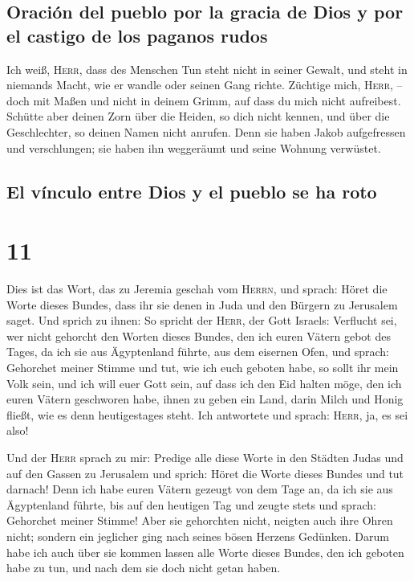 \hypertarget{oraciuxf3n-del-pueblo-por-la-gracia-de-dios-y-por-el-castigo-de-los-paganos-rudos}{%
\subsection{Oración del pueblo por la gracia de Dios y por el castigo de
los paganos
rudos}\label{oraciuxf3n-del-pueblo-por-la-gracia-de-dios-y-por-el-castigo-de-los-paganos-rudos}}

 Ich weiß, \textsc{Herr}, dass des Menschen Tun steht
nicht in seiner Gewalt, und steht in niemands Macht, wie er wandle oder
seinen Gang richte.  Züchtige mich, \textsc{Herr}, --
doch mit Maßen und nicht in deinem Grimm, auf dass du mich nicht
aufreibest.  Schütte aber deinen Zorn über die Heiden, so
dich nicht kennen, und über die Geschlechter, so deinen Namen nicht
anrufen. Denn sie haben Jakob aufgefressen und verschlungen; sie haben
ihn weggeräumt und seine Wohnung verwüstet.

\hypertarget{el-vuxednculo-entre-dios-y-el-pueblo-se-ha-roto}{%
\subsection{El vínculo entre Dios y el pueblo se ha
roto}\label{el-vuxednculo-entre-dios-y-el-pueblo-se-ha-roto}}

\hypertarget{section-10}{%
\section{11}\label{section-10}}

 Dies ist das Wort, das zu Jeremia geschah vom
\textsc{Herrn}, und sprach:  Höret die Worte dieses
Bundes, dass ihr sie denen in Juda und den Bürgern zu Jerusalem saget.
 Und sprich zu ihnen: So spricht der \textsc{Herr}, der
Gott Israels: Verflucht sei, wer nicht gehorcht den Worten dieses
Bundes,  den ich euren Vätern gebot des Tages, da ich sie
aus Ägyptenland führte, aus dem eisernen Ofen, und sprach: Gehorchet
meiner Stimme und tut, wie ich euch geboten habe, so sollt ihr mein Volk
sein, und ich will euer Gott sein,  auf dass ich den Eid
halten möge, den ich euren Vätern geschworen habe, ihnen zu geben ein
Land, darin Milch und Honig fließt, wie es denn heutigestages steht. Ich
antwortete und sprach: \textsc{Herr}, ja, es sei also!

 Und der \textsc{Herr} sprach zu mir: Predige alle diese
Worte in den Städten Judas und auf den Gassen zu Jerusalem und sprich:
Höret die Worte dieses Bundes und tut darnach!  Denn ich
habe euren Vätern gezeugt von dem Tage an, da ich sie aus Ägyptenland
führte, bis auf den heutigen Tag und zeugte stets und sprach: Gehorchet
meiner Stimme!  Aber sie gehorchten nicht, neigten auch
ihre Ohren nicht; sondern ein jeglicher ging nach seines bösen Herzens
Gedünken. Darum habe ich auch über sie kommen lassen alle Worte dieses
Bundes, den ich geboten habe zu tun, und nach dem sie doch nicht getan
haben.

